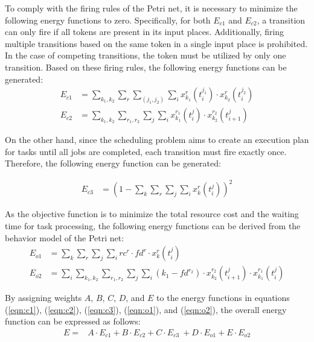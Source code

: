 \documentclass[conference]{IEEEtran}
\begin{document}
To comply with the firing rules of the Petri net, it is necessary to minimize the following energy functions to zero. Specifically, for both $E_{c1}$ and $E_{c2}$, a transition can only fire if all tokens are present in its input places. Additionally, firing multiple transitions based on the same token in a single input place is prohibited. In the case of competing transitions, the token must be utilized by only one transition. Based on these firing rules, the following energy functions can be generated: 
\begin{align} 
E_{c1} &= \sum_{k_1,k_2} \sum_r \sum_{(j_1,j_2)} \sum_i x_{k_1}^{r}(t_{i}^{j_1}) \cdot x_{k_2}^{r}(t_{i}^{j_2}) \label{eqn:c1}\\ 
E_{c2} &= \sum_{k_1,k_2} \sum_{r_1,r_2} \sum_j \sum_i x_{k_1}^{r_1}(t_{i}^{j}) \cdot x_{k_2}^{r_2}(t_{i+1}^{j}) \label{eqn:c2} 
\end{align}

On the other hand, since the scheduling problem aims to create an execution plan for tasks until all jobs are completed, each transition must fire exactly once. Therefore, the following energy function can be generated: 

\begin{align} 
E_{c3} &= \left( 1 - \sum_k \sum_r \sum_j \sum_i x_{k}^{r}(t_{i}^{j}) \right)^2 \label{eqn:c3} 
\end{align}

As the objective function is to minimize the total resource cost and the waiting time for task processing, the following energy functions can be derived from the behavior model of the Petri net: 
\begin{align} 
E_{o1} &= \sum_k \sum_r \sum_j \sum_i rc^r \cdot fd^r \cdot x_{k}^{r}(t_{i}^{j}) \label{eqn:o1}\\
E_{o2} &= \sum_i \sum_{k_1,k_2} \sum_{r_1,r_2} \sum_j \sum_i \left( k_1 - fd^{r_2} \right) \cdot x_{k_2}^{r_2}(t_{i+1}^{j}) \cdot x_{k_1}^{r_1}(t_{i}^{j}) \label{eqn:o2} 
\end{align}

By assigning weights $A$, $B$, $C$, $D$, and $E$ to the energy functions in equations (\ref{eqn:c1}), (\ref{eqn:c2}), (\ref{eqn:c3}), (\ref{eqn:o1}), and (\ref{eqn:o2}), the overall energy function can be expressed as follows: 
\begin{align} 
E = &A \cdot E_{c1} + B \cdot E_{c2} + C \cdot E_{c3} \ + D \cdot E_{o1} + E \cdot E_{o2} 
\end{align}
\end{document}
